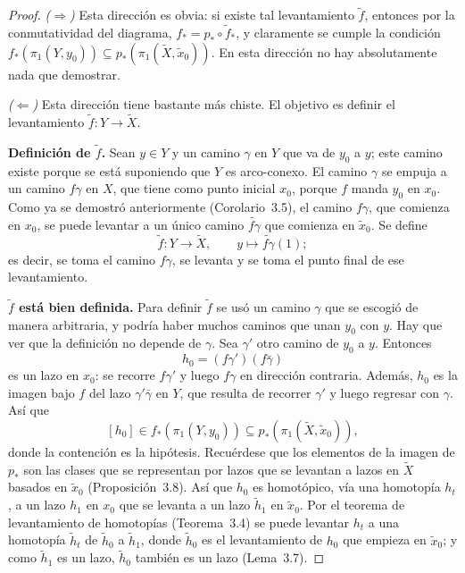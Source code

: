 \documentclass[11pt]{article}
\begin{document}
\begin{proof}
\emph{($\Rightarrow$)} Esta dirección es obvia: si existe tal levantamiento $\tilde f$, entonces por la conmutatividad del diagrama, $f_*=p_*\circ\tilde f_*$, y claramente se cumple la condición $f_*(\pi_1(Y,y_0))\subseteq p_*(\pi_1(\tilde X,\tilde x_0))$. En esta dirección no hay absolutamente nada que demostrar.

\medskip\noindent\emph{($\Leftarrow$)} Esta dirección tiene bastante más chiste. El objetivo es definir el levantamiento $\tilde f\colon Y\to\tilde X$.

\medskip\noindent\textbf{Definición de $\tilde f$.} Sean $y\in Y$ y un camino $\gamma$ en $Y$ que va de $y_0$ a $y$; este camino existe porque se está suponiendo que $Y$ es arco-conexo. El camino $\gamma$ se empuja a un camino $f\gamma$ en $X$, que tiene como punto inicial $x_0$, porque $f$ manda $y_0$ en $x_0$. Como ya se demostró anteriormente (Corolario~3.5), el camino $f\gamma$, que comienza en $x_0$, se puede levantar a un único camino $\widetilde{f\gamma}$ que comienza en $\tilde x_0$. Se define
\[
  \tilde f\colon Y\to\tilde X,\qquad y\longmapsto\widetilde{f\gamma}(1);
\]
es decir, se toma el camino $f\gamma$, se levanta y se toma el punto final de ese levantamiento.

\medskip\noindent\textbf{$\tilde f$ está bien definida.} Para definir $\tilde f$ se usó un camino $\gamma$ que se escogió de manera arbitraria, y podría haber muchos caminos que unan $y_0$ con $y$. Hay que ver que la definición no depende de $\gamma$. Sea $\gamma'$ otro camino de $y_0$ a $y$. Entonces
\[
  h_0=(f\gamma')(f\bar\gamma)
\]
es un lazo en $x_0$: se recorre $f\gamma'$ y luego $f\gamma$ en dirección contraria. Además, $h_0$ es la imagen bajo $f$ del lazo $\gamma'\bar\gamma$ en $Y$, que resulta de recorrer $\gamma'$ y luego regresar con $\gamma$. Así que
\[
  [h_0]\in f_*(\pi_1(Y,y_0))\subseteq p_*(\pi_1(\tilde X,\tilde x_0)),
\]
donde la contención es la hipótesis. Recuérdese que los elementos de la imagen de $p_*$ son las clases que se representan por lazos que se levantan a lazos en $\tilde X$ basados en $\tilde x_0$ (Proposición~3.8). Así que $h_0$ es homotópico, vía una homotopía $h_t$, a un lazo $h_1$ en $x_0$ que se levanta a un lazo $\tilde h_1$ en $\tilde x_0$. Por el teorema de levantamiento de homotopías (Teorema~3.4) se puede levantar $h_t$ a una homotopía $\tilde h_t$ de $\tilde h_0$ a $\tilde h_1$, donde $\tilde h_0$ es el levantamiento de $h_0$ que empieza en $\tilde x_0$; y como $\tilde h_1$ es un lazo, $\tilde h_0$ también es un lazo (Lema~3.7).


\end{proof}
\end{document}

